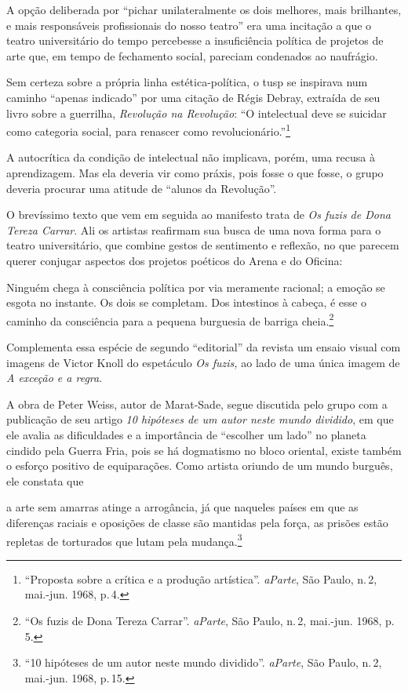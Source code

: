 A opção deliberada por “pichar unilateralmente os dois melhores, mais
brilhantes, e mais responsáveis profissionais do nosso teatro” era uma
incitação a que o teatro universitário do tempo percebesse a
insuficiência política de projetos de arte que, em tempo de fechamento
social, pareciam condenados ao naufrágio.

Sem certeza sobre a própria linha estética-política, o {\sc tusp} se inspirava
num caminho “apenas indicado” por uma citação de Régis Debray, extraída
de seu livro sobre a guerrilha, {\it Revolução na Revolução}: “O
intelectual deve se suicidar como categoria social, para renascer como
revolucionário.”\footnote{“Proposta sobre a crítica e a produção
  artística”. {\it aParte}, São Paulo, n.\,2, mai.-jun. 1968, p.\,4.}

A autocrítica da condição de intelectual não implicava, porém, uma
recusa à aprendizagem. Mas ela deveria vir como práxis, pois fosse o que
fosse, o grupo deveria procurar uma atitude de “alunos da Revolução”.

O brevíssimo texto que vem em seguida ao manifesto trata de {\it Os
fuzis de Dona Tereza Carrar}. Ali os artistas reafirmam sua busca de uma
nova forma para o teatro universitário, que combine gestos de sentimento
e reflexão, no que parecem querer conjugar aspectos dos projetos
poéticos do Arena e do Oficina:

\startblockquote
Ninguém chega à consciência política por via meramente racional; a
emoção se esgota no instante. Os dois se completam. Dos intestinos à
cabeça, é esse o caminho da consciência para a pequena burguesia de
barriga cheia.\footnote{“Os fuzis de Dona Tereza Carrar”. {\it aParte},
  São Paulo, n.\,2, mai.-jun. 1968, p. 5.}
\stopblockquote

Complementa essa espécie de segundo “editorial” da revista um ensaio
visual com imagens de Victor Knoll do espetáculo {\it Os fuzis,} ao lado
de uma única imagem de {\it A exceção e a regra}.

A obra de Peter Weiss, autor de Marat-Sade, segue discutida pelo grupo
com a publicação de seu artigo {\it 10 hipóteses de um autor neste mundo
dividido}, em que ele avalia as dificuldades e a importância de
“escolher um lado” no planeta cindido pela Guerra Fria, pois se há
dogmatismo no bloco oriental, existe também o esforço positivo de
equiparações. Como artista oriundo de um mundo burguês, ele constata que

\startblockquote
a arte sem amarras atinge a arrogância, já que naqueles países em que as
diferenças raciais e oposições de classe são mantidas pela força, as
prisões estão repletas de torturados que lutam pela mudança.\footnote{“10
  hipóteses de um autor neste mundo dividido”. {\it aParte}, São Paulo,
  n.\,2, mai.-jun. 1968, p.\,15.}
\stopblockquote


